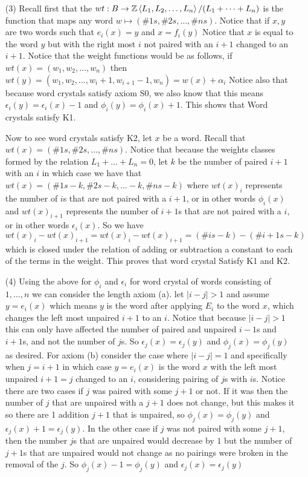 \documentclass[12pt]{amsart}
\begin{document}
\begin{itemize}
    \item[(3)] %
    Recall first that the $wt:B\rightarrow \mathbb{Z}\left\langle L_1,L_2,\dots, L_n \right\rangle/(L_1+\dots+L_n)$ is the function that maps any 
    word $w\mapsto(\#1s, \#2s,\dots,\#ns)$. Notice that if $x,y$ are two words such that $e_i(x)=y$ and $x=f_i(y)$
    Notice that $x$ is equal to the word $y$ but with the right most $i$ not paired with an $i+1$ 
    changed to an $i+1$. Notice that the weight functions would be as follows, if $wt(x)=(w_1, w_2,\dots,w_n)$ then
    $wt(y)=(w_1, w_2,\dots,w_i+1,w_{i+1}-1,w_n)=w(x)+\alpha_i$ Notice also that because word crystals satisfy axiom S0,
    we also know that this means $\epsilon_i(y)=\epsilon_i(x)-1$ and $\phi_i(y)=\phi_i(x)+1$. This shows that Word crystals satisfy K1.
    
    Now to see word crystals satisfy K2, let $x$ be a word. Recall that $wt(x)=(\#1s, \#2s,\dots,\#ns)$. 
    Notice that because the weights classes formed by the relation $L_1+\dots+L_n=0$, let
    $k$ be the number of paired $i+1$ with an $i$ in which case we have that $wt(x)=(\#1s-k, \#2s-k,\dots-k,\#ns-k)$
    where $wt(x)_i$ represents the number of $i$s that are not paired with a $i+1$, or in other words $\phi_i(x)$
    and $wt(x)_{i+1}$ represents the number of $i+1$s that are not paired with a $i$, or in other words $\epsilon_i(x)$.
    So we have $wt(x)_i-wt(x)_{i+1}=wt(x)_i-wt(x)_{i+1}=(\# is-k) - (\# i+1s-k)$ which is closed under the 
    relation of adding or subtraction a constant to each of the terms in the weight. This proves that word crystal Satisfy K1 and K2.\\

    \item[(4)] %
    Using the above for $\phi_i$ and $\epsilon_i$ for word crystal of words consisting 
    of $1,\dots,n$ we can consider the length axiom (a).
    let $|i-j|>1$ and assume $y=e_i(x)$ which means $y$ is the word after applying $E_i$ to the word $x$, 
    which changes the left most unpaired $i+1$ to an $i$. Notice that because $|i-j|>1$ this can only have affected 
    the number of paired and unpaired $i-1$s and $i+1$s, and not the number of $j$s. 
    So $\epsilon_j(x)=\epsilon_j(y)$ and $\phi_j(x)=\phi_j(y)$ as desired.
    For axiom (b) consider the case where $|i-j|=1$ and specifically when $j=i+1$ in which case
    $y=e_i(x)$ is the word $x$ with the left most unpaired $i+1=j$ changed to an $i$, 
    considering pairing of $j$s with $i$s. Notice there are two cases if $j$ was paired with some $j+1$ or not.
    If it was then the number of $j$ that are unpaired with a $j+1$ does not change, 
    but this makes it so there are 1 addition $j+1$ that is unpaired, 
    so $\phi_j(x)=\phi_j(y)$ and $\epsilon_j(x)+1=\epsilon_j(y)$. In the other case if $j$ was 
    not paired with some $j+1$, then the number $j$s that are unpaired would decrease by $1$ but the number 
    of $j+1$s that are unpaired would not change as no pairings were broken in the removal of the $j$. 
    So $\phi_j(x)-1=\phi_j(y)$ and $\epsilon_j(x)=\epsilon_j(y)$


\end{itemize}
\end{document}
